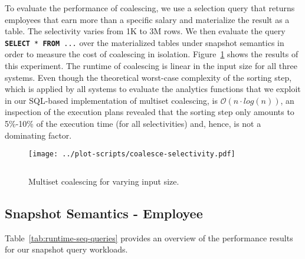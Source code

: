 To evaluate the performance of coalescing, we use a selection query
that returns employees that earn more than a specific salary and
materialize the result as a table.  The selectivity varies from 1K to
3M rows.  We then evaluate the query \texttt{\textbf{SELECT} *
  \textbf{FROM} ...}  over the materialized tables under snapshot
semantics in order to measure the cost of coalescing in isolation.
Figure~\ref{fig:coalesce-selectivity} shows the results of this
experiment.  The runtime of coalescing is linear in the input size for
all three systems.  Even though the theoretical worst-case complexity
of the sorting step, which is applied by all systems to evaluate the
analytics functions that we exploit in our SQL-based implementation of
multiset coalescing, is $\mathcal{O}(n \cdot log (n))$, an inspection
of the execution plans revealed that the sorting step only amounts to
5\%-10\% of the execution time (for all selectivities) and, hence, is
not a dominating factor.

\begin{figure}[t]
  \centering
  \texttt{[image: ../plot-scripts/coalesce-selectivity.pdf]}
  \caption{Multiset coalescing for varying input size.}$\,$\\[1mm]
  \label{fig:coalesce-selectivity}
\end{figure}


\subsection{Snapshot Semantics  - Employee}
\label{sssec:sequ-semant-quer}

Table~\ref{tab:runtime-seq-queries} provides an overview of the
performance results for our snapshot query workloads. 

